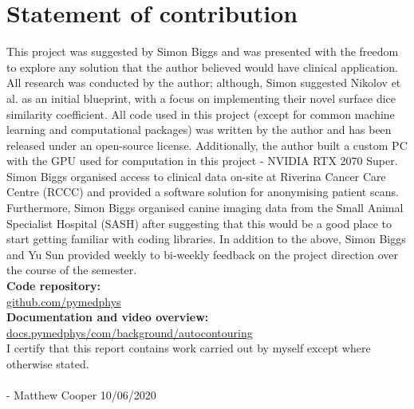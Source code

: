 \chapter{Statement of contribution}
\label{ch:contribution}

This project was suggested by Simon Biggs and was presented with the freedom to
explore any solution that the author believed would have clinical application.
All research was conducted by the author; although, Simon suggested Nikolov et
al. as an initial blueprint, with a focus on implementing their novel surface
dice similarity coefficient. All code used in this project (except for common
machine learning and computational packages) was written by the author and has
been released under an open-source license. Additionally, the author built a
custom PC with the GPU used for computation in this project - NVIDIA RTX 2070
Super. Simon Biggs organised access to clinical data on-site at Riverina Cancer
Care Centre (RCCC) and provided a software solution for anonymising patient
scans. Furthermore, Simon Biggs organised canine imaging data from the Small
Animal Specialist Hospital (SASH) after suggesting that this would be a good
place to start getting familiar with coding libraries. In addition to the above,
Simon Biggs and Yu Sun provided weekly to bi-weekly feedback on the project
direction over the course of the semester. \\


\textbf{Code repository:} \\
\href{https://github.com/pymedphys/pymedphys}{github.com/pymedphys} \\

\textbf{Documentation and video overview:} \\ 
\href{https://docs.pymedphys.com/background/autocontouring.html}{docs.pymedphys/com/background/autocontouring} \\


I certify that this report contains work carried out by myself except where otherwise
stated.
\\
\\
- Matthew Cooper     10/06/2020
\\
\\
